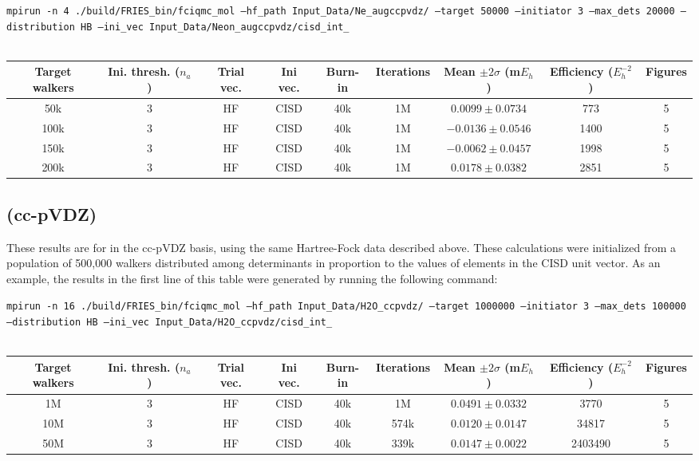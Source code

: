 \documentclass[12pt, landscape]{article}
\begin{document}
\texttt{mpirun -n 4 ./build/FRIES\_bin/fciqmc\_mol --hf\_path Input\_Data/Ne\_augccpvdz/ --target 50000 --initiator 3 --max\_dets 20000 --distribution HB --ini\_vec Input\_Data/Neon\_augccpvdz/cisd\_int\_}
\\~\\
\begin{tabular}{c|c|c|c|c|c|c|c|c}
Target walkers & Ini. thresh. ($n_a$) & Trial vec. & Ini vec. & Burn-in & Iterations & Mean $\pm 2 \sigma$ (m$E_h$) & Efficiency ($E_h^{-2}$) & Figures \\ \hline
50k & 3 & HF & CISD & 40k & 1M & $0.0099 \pm 0.0734$ & 773 & 5 \\
100k & 3 & HF & CISD & 40k & 1M & $-0.0136 \pm 0.0546$ & 1400 & 5 \\
150k & 3 & HF & CISD & 40k & 1M & $-0.0062 \pm 0.0457$ & 1998 & 5 \\
200k & 3 & HF & CISD & 40k & 1M & $0.0178 \pm 0.0382$ & 2851 & 5 \\
\end{tabular}


\subsection*{ (cc-pVDZ)}
These results are for  in the cc-pVDZ basis, using the same Hartree-Fock data described above. These calculations were initialized from a population of 500,000 walkers distributed among determinants in proportion to the values of elements in the CISD unit vector. As an example, the results in the first line of this table were generated by running the following command:

\texttt{mpirun -n 16 ./build/FRIES\_bin/fciqmc\_mol --hf\_path Input\_Data/H2O\_ccpvdz/ --target 1000000 --initiator 3 --max\_dets 100000 --distribution HB --ini\_vec Input\_Data/H2O\_ccpvdz/cisd\_int\_}
\\~\\
\begin{tabular}{c|c|c|c|c|c|c|c|c}
Target walkers & Ini. thresh. ($n_a$) & Trial vec. & Ini vec. & Burn-in & Iterations & Mean $\pm 2 \sigma$ (m$E_h$) & Efficiency ($E_h^{-2}$) & Figures \\ \hline
1M & 3 & HF & CISD & 40k & 1M & $0.0491 \pm 0.0332$ & 3770 & 5\\
10M & 3 & HF & CISD & 40k & 574k & $0.0120 \pm 0.0147$ & 34817 & 5\\
50M & 3 & HF & CISD & 40k & 339k & $0.0147 \pm 0.0022$ & 2403490 & 5 \\
\end{tabular}
\end{document}
